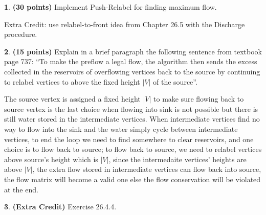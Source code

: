 \documentclass[11pt]{article}
\theoremstyle{definition}
\theoremstyle{theorem}
\newtheorem{prob}{}
\newcommand{\solution}{\medskip\noindent{\color{DarkBlue}\textbf{Solution:}}}
\begin{document}
\begin{prob} \textbf{(30 points)} Implement Push-Relabel for finding maximum flow.

Extra Credit: use relabel-to-front idea from Chapter 26.5 with the Discharge procedure.
\end{prob}
\solution

\begin{prob} \textbf{(15 points)} Explain in a brief paragraph the following sentence from textbook page 737: “To make the preflow a legal flow, the algorithm then sends the excess collected in the reservoirs of overflowing vertices back to the source by continuing to relabel vertices to above the fixed height $|V|$ of the source”.
\end{prob}
\solution
The source vertex is assigned a fixed height $|V|$ to make sure flowing back to source vertex is the last choice when flowing into sink is not possible but there is still water stored in the intermediate vertices. When intermediate vertices find no way to flow into the sink and the water simply cycle between intermediate vertices, to end the loop we need to find somewhere to clear reservoirs, and one choice is to flow back to source; to flow back to source, we need to relabel vertices above source's height which is $|V|$, since the intermedaite vertices' heights are above $|V|$, the extra flow stored in intermediate vertices can flow back into source, the flow matrix will become a valid one else the flow conservation will be violated at the end.
\begin{prob} \textbf{(Extra Credit)} Exercise 26.4.4.
\end{prob}
\solution
\end{document}
